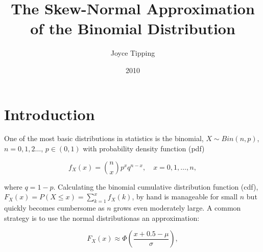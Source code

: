 \title{The Skew-Normal Approximation of the Binomial Distribution}
\author{Joyce Tipping}
\date{2010}
\maketitle

\section{Introduction}

One of the most basic distributions in statistics is the binomial, $X \sim
Bin(n,p)$, $n = 0, 1, 2 \ldots$, $p \in (0, 1)$ with probability density
function (pdf)

\begin{equation*}
  f_X(x) = \binom{n}{x} p^x q^{n-x}, \quad x = 0, 1, \ldots, n,
\end{equation*}

where $q=1-p$. Calculating the binomial cumulative distribution function (cdf),
$F_X(x) = P(X \leq x) = \sum_{k=1}^x f_X(k)$, by hand is manageable for small
$n$ but quickly becomes cumbersome as $n$ grows even moderately large. A common
strategy is to use the normal distribution\footnotemark as an approximation:


\begin{equation}
  F_X(x) \approx \Phi \left( \frac{x + 0.5 - \mu}{\sigma} \right),
\end{equation}


